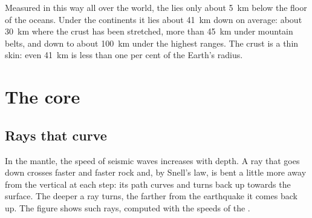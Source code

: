 Measured in this way all over the world, the  lies only about
\qty{5}{km} below the floor of the oceans. Under the continents it lies about
\qty{41}{km} down on average: about \qty{30}{km} where the crust has been
stretched, more than \qty{45}{km} under mountain belts, and down to about
\qty{100}{km} under the highest ranges. The crust is a thin skin: even
\qty{41}{km} is less than one per cent of the Earth's radius.

\section{The core}

\subsection{Rays that curve}

In the mantle, the speed of seismic waves increases with depth. A ray that
goes down crosses faster and faster rock and, by Snell's law, is bent a
little more away from the vertical at each step: its path curves and turns
back up towards the surface. The deeper a ray turns, the farther from the
earthquake it comes back up. The figure shows such rays, computed with the
speeds of the .

